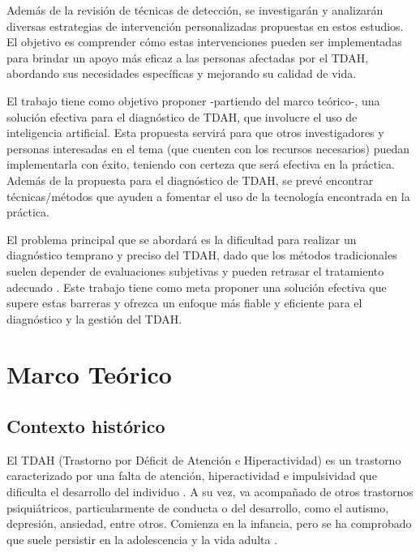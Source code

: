 \documentclass[10pt,journal,compsoc]{IEEEtran}
\begin{document}
Además de la revisión de técnicas de detección, se investigarán y analizarán diversas estrategias de intervención personalizadas propuestas en estos estudios. El objetivo es comprender cómo estas intervenciones pueden ser implementadas para brindar un apoyo más eficaz a las personas afectadas por el TDAH, abordando sus necesidades específicas y mejorando su calidad de vida.

El trabajo tiene como objetivo proponer -partiendo del marco teórico-, una solución efectiva para el diagnóstico de TDAH, que involucre el uso de inteligencia artificial. Esta propuesta servirá para que otros investigadores y personas interesadas en el tema (que cuenten con los recursos necesarios) puedan implementarla con éxito, teniendo con certeza que será efectiva en la práctica. Además de la propuesta para el diagnóstico de TDAH, se prevé encontrar técnicas/métodos que ayuden a fomentar el uso de la tecnología encontrada en la práctica.

El problema principal que se abordará es la dificultad para realizar un diagnóstico temprano y preciso del TDAH, dado que los métodos tradicionales suelen depender de evaluaciones subjetivas y pueden retrasar el tratamiento adecuado \cite{khullar2021deep}. Este trabajo tiene como meta proponer una solución efectiva que supere estas barreras y ofrezca un enfoque más fiable y eficiente para el diagnóstico y la gestión del TDAH.

\section{Marco Teórico}
\subsection{Contexto histórico}
El TDAH (Trastorno por Déficit de Atención e Hiperactividad) es un trastorno caracterizado por una falta de atención, hiperactividad e impulsividad que dificulta el desarrollo del individuo \cite{thapar2008overview}. A su vez, va acompañado de otros trastornos psiquiátricos, particularmente de conducta o del desarrollo, como el autismo, depresión, ansiedad, entre otros. Comienza en la infancia, pero se ha comprobado que suele persistir en la adolescencia y la vida adulta \cite{combs2015perceived}.
\end{document}
